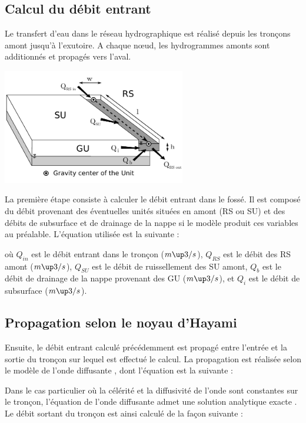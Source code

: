 \subsection{Calcul du débit entrant}
Le transfert d'eau dans le réseau hydrographique est réalisé depuis les tronçons amont jusqu'à l'exutoire. A chaque nœud, les hydrogrammes amonts sont additionnés et propagés vers l’aval.

\includegraphics[width=8cm]{common/Schema_GU_RS_SU_Hayami_RS.pdf}

La première étape consiste à calculer le débit entrant dans le fossé. Il est composé du débit provenant des éventuelles unités situées en amont (RS ou SU) et des débits de subsurface et de drainage de la nappe si le modèle produit ces variables au préalable. L'équation utilisée est la suivante :



où $Q_{in}$ est le débit entrant dans le tronçon ($m\up3/s$), $Q_{RS}$ est le débit des RS amont ($m\up3/s$), $Q_{SU}$ est le débit de ruissellement des SU amont, $Q_b$ est le débit de drainage de la nappe provenant des GU ($m\up3/s$), et $Q_i$ est le débit de subsurface ($m\up3/s$).\\


\subsection{Propagation selon le noyau d'Hayami}
Ensuite, le débit entrant calculé précédemment est propagé entre l'entrée et la sortie du tronçon sur lequel est effectué le calcul. La propagation est réalisée selon le modèle de l'onde diffusante \cite{Moussa1997}, dont l'équation est la suivante :



Dans le cas particulier où la célérité et la diffusivité de l'onde sont constantes sur le tronçon, l’équation de l’onde diffusante admet une solution analytique exacte \cite{Moussa1996}. Le débit sortant du tronçon est ainsi calculé de la façon suivante :

